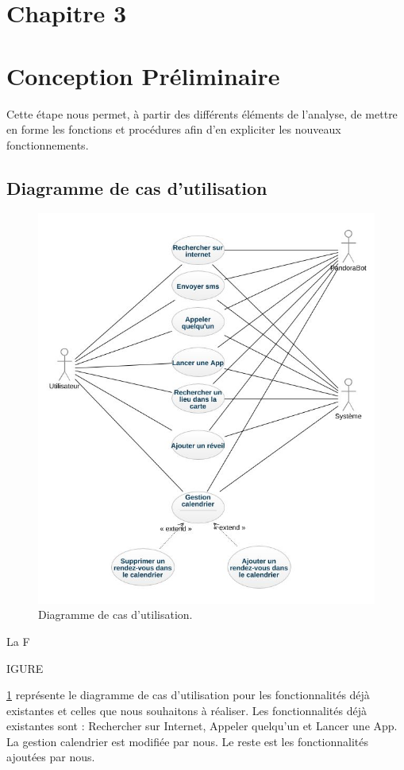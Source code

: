 \section*{Chapitre 3}
\section{Conception Préliminaire}

\indent Cette étape nous permet, à partir des différents éléments de l'analyse, de mettre en forme les fonctions et procédures afin d'en expliciter les nouveaux fonctionnements.

\subsection{Diagramme de cas d'utilisation}

\begin{figure}[ht]
\centering
\includegraphics[scale=0.5]{./diagrammes/UsecaseDiagram.jpeg}
\caption{Diagramme de cas d'utilisation.\label{fig2}}
\end{figure}

\indent La F\begin{footnotesize}IGURE\end{footnotesize} \ref{fig2} représente le diagramme de cas d'utilisation pour les fonctionnalités déjà existantes et celles que nous souhaitons à réaliser. Les fonctionnalités déjà existantes sont : Rechercher sur Internet, Appeler quelqu'un et Lancer une App. La gestion calendrier est modifiée par nous. Le reste est les fonctionnalités ajoutées par nous.

